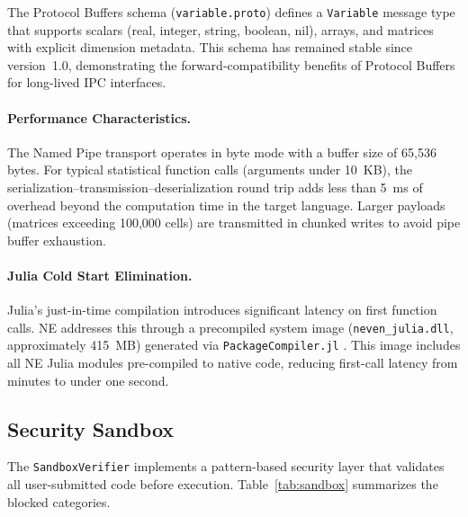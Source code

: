 \documentclass[preprint,12pt,authoryear]{elsarticle}
\newcommand{\neven}{NE\raisebox{0.2ex}{v}\rotatebox[origin=c]{180}{E}\rotatebox[origin=c]{180}{N}}
\begin{document}
The Protocol Buffers schema (\texttt{variable.proto}) defines a \texttt{Variable} message type that supports scalars (real, integer, string, boolean, nil), arrays, and matrices with explicit dimension metadata. This schema has remained stable since version~1.0, demonstrating the forward-compatibility benefits of Protocol Buffers for long-lived IPC interfaces.

\paragraph{Performance Characteristics.}
The Named Pipe transport operates in byte mode with a buffer size of 65,536 bytes. For typical statistical function calls (arguments under 10~KB), the serialization--transmission--deserialization round trip adds less than 5~ms of overhead beyond the computation time in the target language. Larger payloads (matrices exceeding 100,000 cells) are transmitted in chunked writes to avoid pipe buffer exhaustion.

\paragraph{Julia Cold Start Elimination.}
Julia's just-in-time compilation introduces significant latency on first function calls. \neven{} addresses this through a precompiled system image (\texttt{neven\_julia.dll}, approximately 415~MB) generated via \texttt{PackageCompiler.jl} \citep{PackageCompiler2023}. This image includes all \neven{} Julia modules pre-compiled to native code, reducing first-call latency from minutes to under one second.

\subsection{Security Sandbox}
\label{subsec:sandbox}

The \texttt{SandboxVerifier} implements a pattern-based security layer that validates all user-submitted code before execution. Table~\ref{tab:sandbox} summarizes the blocked categories.
\end{document}
